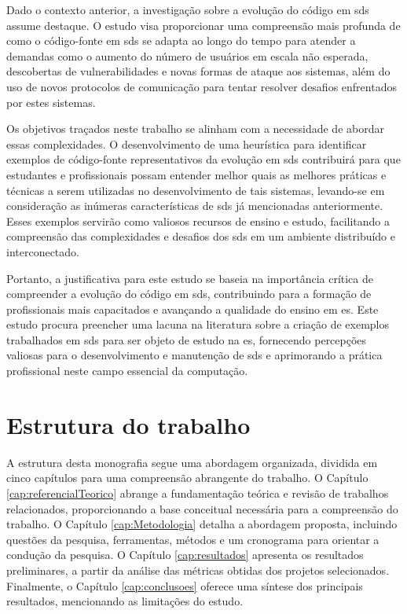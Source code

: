 Dado o contexto anterior, a investigação sobre a evolução do código em \gls{sds} assume destaque. O estudo visa proporcionar uma compreensão mais profunda de como o código-fonte em \gls{sds} se adapta ao longo do tempo para atender a demandas como o aumento do número de usuários em escala não esperada, descobertas de vulnerabilidades e novas formas de ataque aos sistemas, além do uso de novos protocolos de comunicação para tentar resolver desafios enfrentados por estes sistemas.

Os objetivos traçados neste trabalho se alinham com a necessidade de abordar essas complexidades. O desenvolvimento de uma heurística para identificar exemplos de código-fonte representativos da evolução em \gls{sds} contribuirá para que estudantes e profissionais possam entender melhor quais as melhores práticas e técnicas a serem utilizadas no desenvolvimento de tais sistemas, levando-se em consideração as inúmeras características de \gls{sds} já mencionadas anteriormente. Esses exemplos servirão como valiosos recursos de ensino e estudo, facilitando a compreensão das complexidades e desafios dos \gls{sds} em um ambiente distribuído e interconectado.

Portanto, a justificativa para este estudo se baseia na importância crítica de compreender a evolução do código em \gls{sds}, contribuindo para a formação de profissionais mais capacitados e avançando a qualidade do ensino em \gls{es}. Este estudo procura preencher uma lacuna na literatura sobre a criação de exemplos trabalhados em \gls{sds} para ser objeto de estudo na \gls{es}, fornecendo percepções valiosas para o desenvolvimento e manutenção de \gls{sds} e aprimorando a prática profissional neste campo essencial da computação.

\section{Estrutura do trabalho}
\label{sec:estruturaTrabalho}

A estrutura desta monografia segue uma abordagem organizada, dividida em cinco capítulos para uma compreensão abrangente do trabalho. O Capítulo \ref{cap:referencialTeorico} abrange a fundamentação teórica e revisão de trabalhos relacionados, proporcionando a base conceitual necessária para a compreensão do trabalho. O Capítulo \ref{cap:Metodologia} detalha a abordagem proposta, incluindo questões da pesquisa, ferramentas, métodos e um cronograma para orientar a condução da pesquisa. O Capítulo \ref{cap:resultados} apresenta os resultados preliminares, a partir da análise das métricas obtidas dos projetos selecionados. Finalmente, o Capítulo \ref{cap:conclusoes} oferece uma síntese dos principais resultados, mencionando as limitações do estudo.
